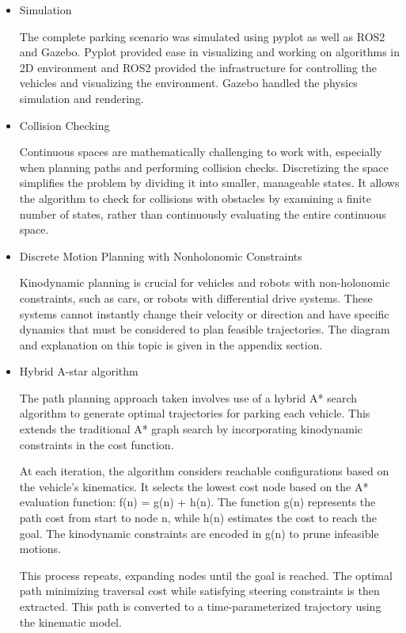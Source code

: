 \documentclass[12pt,a4paper]{article}
\begin{document}
\begin{itemize}
    \item Simulation \par 
The complete parking scenario was simulated using pyplot as well as ROS2 and Gazebo. Pyplot provided ease in visualizing and working on algorithms in 2D environment and ROS2 provided the infrastructure for controlling the vehicles and visualizing the environment. Gazebo handled the physics simulation and rendering.
\par

    \item Collision Checking \par 
Continuous spaces are mathematically challenging to work with, especially when planning paths and performing collision checks. Discretizing the space simplifies the problem by dividing it into smaller, manageable states. It allows the algorithm to check for collisions with obstacles by examining a finite number of states, rather than continuously evaluating the entire continuous space.
\par

    \item Discrete Motion Planning with Nonholonomic Constraints \par 
Kinodynamic planning is crucial for vehicles and robots with non-holonomic constraints, such as cars, or robots with differential drive systems. These systems cannot instantly change their velocity or direction and have specific dynamics that must be considered to plan feasible trajectories. The diagram and explanation on this topic is given in the appendix section.
\par

    \item Hybrid A-star algorithm \par 
The path planning approach taken involves use of a hybrid A* search algorithm to generate optimal trajectories for parking each vehicle. This extends the traditional A* graph search by incorporating kinodynamic constraints in the cost function.

At each iteration, the algorithm considers reachable configurations based on the vehicle's kinematics. It selects the lowest cost node based on the A* evaluation function: f(n) = g(n) + h(n). The function g(n) represents the path cost from start to node n, while h(n) estimates the cost to reach the goal. The kinodynamic constraints are encoded in g(n) to prune infeasible motions.

This process repeats, expanding nodes until the goal is reached. The optimal path minimizing traversal cost while satisfying steering constraints is then extracted. This path is converted to a time-parameterized trajectory using the kinematic model.
\par

\end{itemize}
\end{document}
